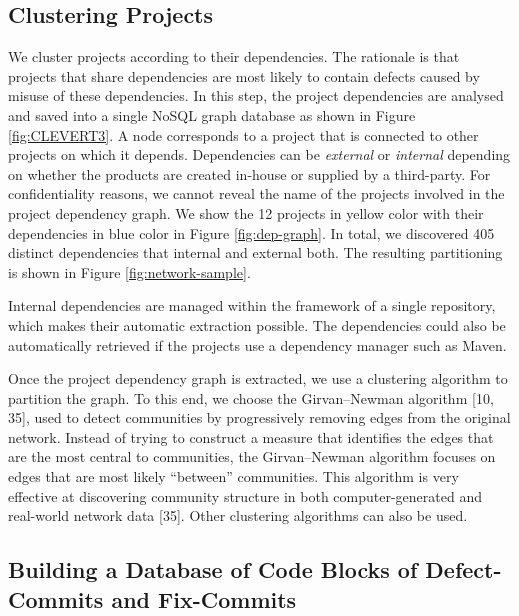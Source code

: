 \documentclass[sigconf]{acmart}
\begin{document}
\subsection{Clustering Projects}\label{sec:clustering}

We cluster projects according to their dependencies. The rationale is
that projects that share dependencies are most likely to contain defects
caused by misuse of these dependencies. In this step, the project
dependencies are analysed and saved into a single NoSQL graph database
as shown in Figure \ref{fig:CLEVERT3}. A node corresponds to a project
that is connected to other projects on which it depends. Dependencies
can be \emph{external} or \emph{internal} depending on whether the
products are created in-house or supplied by a third-party. For
confidentiality reasons, we cannot reveal the name of the projects
involved in the project dependency graph. We show the 12 projects in
yellow color with their dependencies in blue color in Figure
\ref{fig:dep-graph}. In total, we discovered 405 distinct dependencies
that internal and external both. The resulting partitioning is shown in
Figure \ref{fig:network-sample}.



Internal dependencies are managed within the framework of a single
repository, which makes their automatic extraction possible. The
dependencies could also be automatically retrieved if the projects use a
dependency manager such as Maven.



Once the project dependency graph is extracted, we use a clustering
algorithm to partition the graph. To this end, we choose the
Girvan--Newman algorithm {[}10, 35{]}, used to detect communities by
progressively removing edges from the original network. Instead of
trying to construct a measure that identifies the edges that are the
most central to communities, the Girvan--Newman algorithm focuses on
edges that are most likely ``between'' communities. This algorithm is
very effective at discovering community structure in both
computer-generated and real-world network data {[}35{]}. Other
clustering algorithms can also be used.

\subsection{Building a Database of Code Blocks of Defect-Commits and
Fix-Commits}\label{sec:offline}
\end{document}
